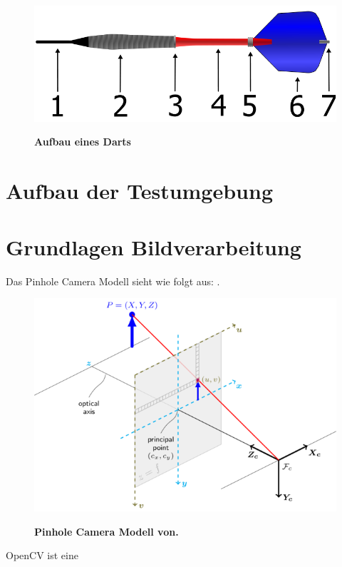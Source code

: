 \begin{figure}
\includegraphics[width=\textwidth]{media/Dart}\\
\caption{\textbf{Aufbau eines Darts\cite{dart2006}}
}
\label{Fig:darts}
\end{figure}

\section{Aufbau der Testumgebung}
\label{sec:setup}

\section{Grundlagen Bildverarbeitung}
\label{sec:basics}
Das Pinhole Camera Modell sieht wie folgt aus: \autocite{Zhang2000}.
\begin{figure}
\includegraphics[scale =0.75]{media/pinhole_camera_model}\\
\caption{\textbf{Pinhole Camera Modell von.\autocite{OpencvCamera2016}}
}
\label{Fig:pinhole}
\end{figure}


OpenCV ist eine \autocite[512--]{Medioni:2004:ETC:993884}


